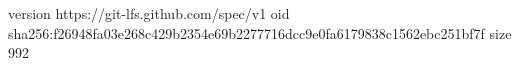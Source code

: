 version https://git-lfs.github.com/spec/v1
oid sha256:f26948fa03e268c429b2354e69b2277716dcc9e0fa6179838c1562ebc251bf7f
size 992
